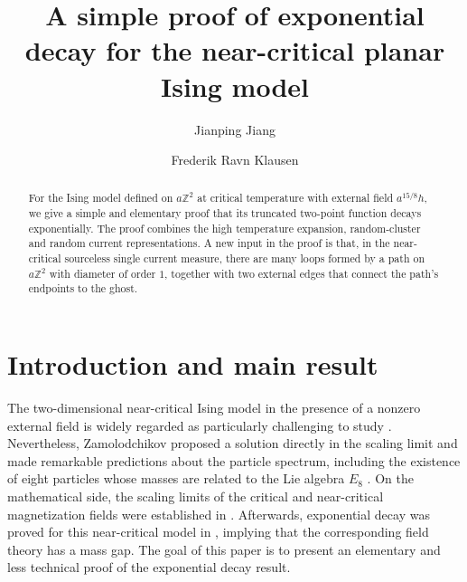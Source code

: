 \documentclass[article,12pt,reqno]{amsart}
\title{A simple proof of exponential decay for the near-critical planar Ising model}
\author{Jianping Jiang}
\author{Frederik Ravn Klausen}
\begin{document}
\begin{abstract}
    For the Ising model defined on $a\mathbb{Z}^2$ at critical temperature with external field $a^{15/8}h$, we give a simple and elementary proof that its truncated two-point function decays exponentially. The proof combines the high temperature expansion, random-cluster and random current representations.
    A new input in the proof is that, in the near-critical sourceless single current measure, there are many loops formed by a path on $a\mathbb{Z}^2$ with diameter of order $1$, together with two external edges that connect the path's endpoints to the ghost.
\end{abstract}

\maketitle


\vspace{-0.8cm}
\section{Introduction and main result}
The two-dimensional near-critical Ising model in the presence of a nonzero external field is widely regarded as particularly challenging to study \cite{Mcc12}. Nevertheless, Zamolodchikov proposed a solution directly in the scaling limit and made remarkable predictions about the particle spectrum, including the existence of eight particles whose masses are related to the Lie algebra $E_8$ \cite{Zam89a, Zam89b}. On the mathematical side, the scaling limits of the critical and near-critical magnetization fields were established in \cite{CGN15, CGN16}. Afterwards, exponential decay was proved for this near-critical model in \cite{CJN20a}, implying that the corresponding field theory has a mass gap. The goal of this paper is to present an elementary and less technical proof of the exponential decay result. 
 
\end{document}
